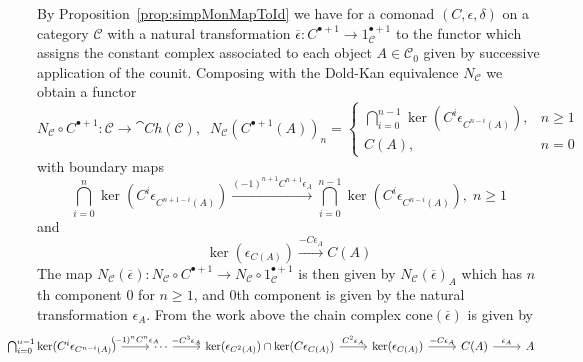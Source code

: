 By Proposition~\ref{prop:simpMonMapToId} we have for a comonad $(C,\epsilon,\delta)$ on a category $\mathcal{C}$ with a natural transformation $\overline{\epsilon}:C^{\bullet+1}\to 1_\mathcal{C}^{\bullet+1}$ to the functor which assigns the constant complex associated to each object $A \in \mathcal{C}_0$ given by successive application of the counit. Composing with the Dold-Kan equivalence $N_\mathcal{C}$ we obtain a functor
\begin{equation*}
    N_\mathcal{C}\circ C^{\bullet+1}:\mathcal{C}\to \cat{Ch}(\mathcal{C}),\;\; N_\mathcal{C}(C^{\bullet+1}(A))_n = \left\{\begin{array}{cc} \bigcap_{i=0}^{n-1}\ker(C^i\epsilon_{C^{n-i}(A)}), & n \geq 1 \\ C(A), & n = 0 \end{array}\right.
\end{equation*}
with boundary maps
\begin{equation*}
    \bigcap_{i=0}^{n}\ker(C^i\epsilon_{C^{n+1-i}(A)})\xrightarrow{(-1)^{n+1}C^{n+1}\epsilon_{A}} \bigcap_{i=0}^{n-1}\ker(C^i\epsilon_{C^{n-i}(A)}),\; n \geq 1
\end{equation*}
and 
\begin{equation*}
    \ker(\epsilon_{C(A)})\xrightarrow{-C\epsilon_A} C(A)
\end{equation*}
The map $N_\mathcal{C}(\overline{\epsilon}):N_\mathcal{C}\circ C^{\bullet+1}\to N_\mathcal{C}\circ 1_\mathcal{C}^{\bullet+1}$ is then given by $N_\mathcal{C}(\overline{\epsilon})_A$ which has $n$th component $0$ for $n \geq 1$, and $0$th component is given by the natural transformation $\epsilon_A$. From the work above the chain complex $\text{cone}(\overline{\epsilon})$ is given by 
\[\begin{tikzcd}
	\hspace{-30pt} {\bigcap_{i=0}^{n-1}\ker(C^i\epsilon_{C^{n-i}(A)})} & \cdots & {\ker(\epsilon_{C^2(A)})\cap \ker(C\epsilon_{C(A)})} & {\ker(\epsilon_{C(A)})} & {C(A)} & A
	\arrow["{-C\epsilon_A}", from=1-4, to=1-5]
	\arrow["{\epsilon_A}", from=1-5, to=1-6]
	\arrow["{C^2\epsilon_A}", from=1-3, to=1-4]
	\arrow["{-C^3\epsilon_A}", from=1-2, to=1-3]
	\arrow["{(-1)^nC^n\epsilon_A}", from=1-1, to=1-2]
\end{tikzcd}\]

